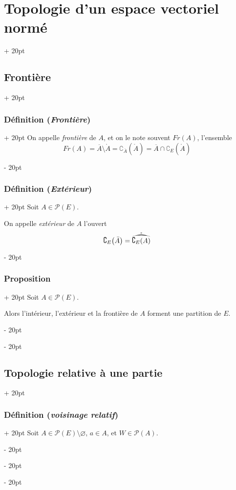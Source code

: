 \documentclass[a4paper, 12pt, twoside]{article}
\newcommand{\cj}[1]{\overline{#1}} %
\newcommand{\lr}[1]{\left( #1 \right)}
\newcommand{\ind}[1][20pt]{\advance\leftskip + #1}
\newcommand{\deind}[1][20pt]{\advance\leftskip - #1}
\newenvironment{indt}[2][20pt]{#2 \par \ind[#1]}{\par \deind} %
\begin{document}
\begin{indt}{\section{Topologie d'un espace vectoriel normé}}
\begin{indt}{\subsection{Frontière}}
\begin{indt}{\subsubsection{Définition (\textit{Frontière})}}
                On appelle \emph{frontière} de $A$, et on le note souvent $Fr(A)$, l'ensemble
                \[
                    Fr(A) = \cj A \setminus \mathring A
                    = \complement_{\cj A}\!\lr{\mathring A}
                    = \cj A \cap \complement_E\!\lr{\mathring A}
                \]
            \end{indt}

            \vspace{12pt}
            
            \begin{indt}{\subsubsection{Définition (\textit{Extérieur})}}
                Soit $A \in \mathcal P(E)$.

                On appelle \emph{extérieur} de $A$ l'ouvert
                \[
                    \complement_E\!\lr{\bar A} = \widering{\complement_E(A)}
                \]
            \end{indt}

            \vspace{12pt}
            
            \begin{indt}{\subsubsection{Proposition}}
                Soit $A \in \mathcal P(E)$.

                Alors l'intérieur, l'extérieur et la frontière de $A$ forment une partition de $E$.
            \end{indt}
        \end{indt}

        \vspace{12pt}
        
        \begin{indt}{\subsection{Topologie relative à une partie}}
            \begin{indt}{\subsubsection{Définition (\textit{voisinage relatif})}}
                Soit $A \in \mathcal P(E) \setminus \varnothing$, $a \in A$, et $W \in \mathcal P(A)$.


\end{indt}
\end{indt}
\end{indt}
\end{document}
